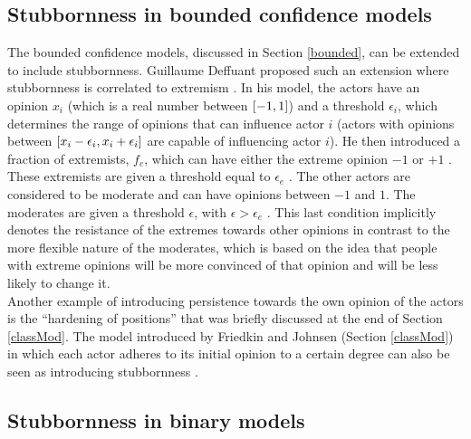 \documentclass[11 pt , letterpaper , twoside , openright]{book}
\begin{document}
\subsection{Stubbornness in bounded confidence models}

The bounded confidence models, discussed in Section \ref{bounded}, can be extended to include stubbornness. Guillaume Deffuant proposed such an extension where stubbornness is correlated to extremism \cite{Deffuant2006}. In his model, the actors have an opinion $x_i$ (which is a real number between $\interval{-1}{1}$) and a threshold $\epsilon_i$, which determines the range of opinions that can influence actor $i$ (actors with opinions between $\interval{x_i - \epsilon_i}{x_i + \epsilon_i}$ are capable of influencing actor $i$). He then introduced a fraction of extremists, $f_e$, which can have either the extreme opinion $-1$ or $+1$ \cite{Deffuant2006}. These extremists are given a threshold equal to $\epsilon_e$ \cite{Deffuant2006}. The other actors are considered to be moderate and can have opinions between $-1$ and $1$. The moderates are given a threshold $\epsilon$, with $\epsilon > \epsilon_e$ \cite{Deffuant2006}. This last condition implicitly denotes the resistance of the extremes towards other opinions in contrast to the more flexible nature of the moderates, which is based on the idea that people with extreme opinions will be more convinced of that opinion and will be less likely to change it.\\
\newline
Another example of introducing persistence towards the own opinion of the actors is the ``hardening of positions'' that was briefly discussed at the end of Section \ref{classMod}. The model introduced by Friedkin and Johnsen (Section \ref{classMod}) in which each actor adheres to its initial opinion to a certain degree can also be seen as introducing stubbornness \cite{Noorazar2020}.

\subsection{Stubbornness in binary models}
\label{stubbBin}
\end{document}
